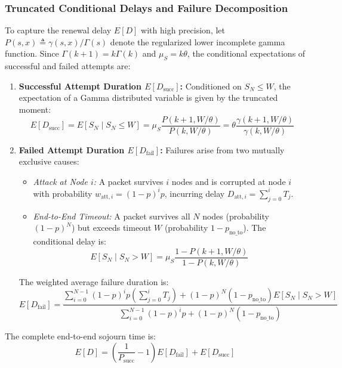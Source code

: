 \documentclass[12pt,onecolumn]{article}
\begin{document}
\subsubsection{Truncated Conditional Delays and Failure Decomposition}
To capture the renewal delay $E[D]$ with high precision, let $P(s, x) \triangleq \gamma(s, x)/\Gamma(s)$ denote the regularized lower incomplete gamma function. Since $\Gamma(k+1) = k\Gamma(k)$ and $\mu_S = k\theta$, the conditional expectations of successful and failed attempts are:
\begin{enumerate}
    \item \textbf{Successful Attempt Duration $E[D_{\text{succ}}]$:} Conditioned on $S_N \le W$, the expectation of a Gamma distributed variable is given by the truncated moment:
    \begin{equation}
    E[D_{\text{succ}}] = E[S_N \mid S_N \le W] = \mu_S \frac{P(k+1, W/\theta)}{P(k, W/\theta)} = \theta \frac{\gamma(k+1, W/\theta)}{\gamma(k, W/\theta)}
    \label{eq:truncated_gamma_succ}
    \end{equation}
    \item \textbf{Failed Attempt Duration $E[D_{\text{fail}}]$:} Failures arise from two mutually exclusive causes:
    \begin{itemize}
        \item \textit{Attack at Node $i$:} A packet survives $i$ nodes and is corrupted at node $i$ with probability $w_{\text{att}, i} = (1 - p)^i p$, incurring delay $D_{\text{att}, i} = \sum_{j=0}^i T_j$.
        \item \textit{End-to-End Timeout:} A packet survives all $N$ nodes (probability $(1-p)^N$) but exceeds timeout $W$ (probability $1 - p_{\text{no\_to}}$). The conditional delay is:
        \begin{equation}
        E[S_N \mid S_N > W] = \mu_S \frac{1 - P(k+1, W/\theta)}{1 - P(k, W/\theta)}
        \end{equation}
    \end{itemize}
    The weighted average failure duration is:
    \begin{equation}
    E[D_{\text{fail}}] = \frac{\sum_{i=0}^{N-1} (1-p)^i p \left(\sum_{j=0}^i T_j\right) + (1-p)^N (1 - p_{\text{no\_to}}) E[S_N \mid S_N > W]}{\sum_{i=0}^{N-1} (1-p)^i p + (1-p)^N (1 - p_{\text{no\_to}})}
    \end{equation}
\end{enumerate}
The complete end-to-end sojourn time is:
\begin{equation}
E[D] = \left(\frac{1}{P_{\text{succ}}} - 1\right) E[D_{\text{fail}}] + E[D_{\text{succ}}]
\end{equation}
\end{document}
